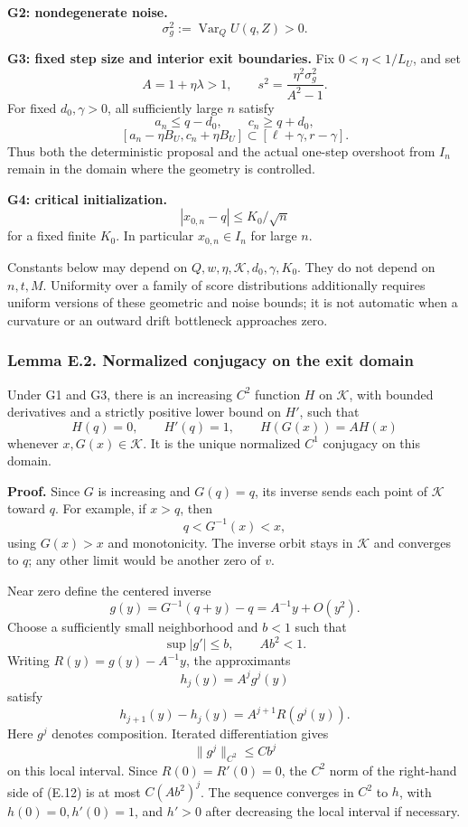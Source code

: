 \textbf{G2: nondegenerate noise.} \[
\sigma_g^2:=\operatorname{Var}_Q U(q,Z)>0.
\tag{E.7}
\]

\textbf{G3: fixed step size and interior exit boundaries.} Fix
\(0<\eta<1/L_U\), and set \[
A=1+\eta\lambda>1,\qquad
s^2=\frac{\eta^2\sigma_g^2}{A^2-1}.
\tag{E.8}
\] For fixed \(d_0,\gamma>0\), all sufficiently large \(n\) satisfy \[
a_n\le q-d_0,\qquad c_n\ge q+d_0,
\] \[
[a_n-\eta B_U,c_n+\eta B_U]
\subset[\ell+\gamma,r-\gamma].
\tag{E.9}
\] Thus both the deterministic proposal and the actual one-step
overshoot from \(I_n\) remain in the domain where the geometry is
controlled.

\textbf{G4: critical initialization.} \[
|x_{0,n}-q|\le K_0/\sqrt n
\tag{E.10}
\] for a fixed finite \(K_0\). In particular \(x_{0,n}\in I_n\) for
large \(n\).

Constants below may depend on \(Q,w,\eta,\mathcal K,d_0,\gamma,K_0\).
They do not depend on \(n,t,M\). Uniformity over a family of score
distributions additionally requires uniform versions of these geometric
and noise bounds; it is not automatic when a curvature or an outward
drift bottleneck approaches zero.

\subsubsection{Lemma E.2. Normalized conjugacy on the exit
domain}\label{scalar_exit-lemma-e.2.-normalized-conjugacy-on-the-exit-domain}

Under G1 and G3, there is an increasing \(C^2\) function \(H\) on
\(\mathcal K\), with bounded derivatives and a strictly positive lower
bound on \(H'\), such that \[
H(q)=0,\qquad H'(q)=1,\qquad H(G(x))=A H(x)
\tag{E.11}
\] whenever \(x,G(x)\in\mathcal K\). It is the unique normalized \(C^1\)
conjugacy on this domain.

\textbf{Proof.} Since \(G\) is increasing and \(G(q)=q\), its inverse
sends each point of \(\mathcal K\) toward \(q\). For example, if
\(x>q\), then \[
q<G^{-1}(x)<x,
\] using \(G(x)>x\) and monotonicity. The inverse orbit stays in
\(\mathcal K\) and converges to \(q\); any other limit would be another
zero of \(v\).

Near zero define the centered inverse \[
g(y)=G^{-1}(q+y)-q=A^{-1}y+O(y^2).
\] Choose a sufficiently small neighborhood and \(b<1\) such that \[
\sup |g'|\le b,\qquad Ab^2<1.
\] Writing \(R(y)=g(y)-A^{-1}y\), the approximants \[
h_j(y)=A^j g^j(y)
\] satisfy \[
h_{j+1}(y)-h_j(y)=A^{j+1}R(g^j(y)).
\tag{E.12}
\] Here \(g^j\) denotes composition. Iterated differentiation gives \[
\|g^j\|_{C^2}\le Cb^j
\] on this local interval. Since \(R(0)=R'(0)=0\), the \(C^2\) norm of
the right-hand side of (E.12) is at most \(C(Ab^2)^j\). The sequence
converges in \(C^2\) to \(h\), with \(h(0)=0,h'(0)=1\), and \(h'>0\)
after decreasing the local interval if necessary.

